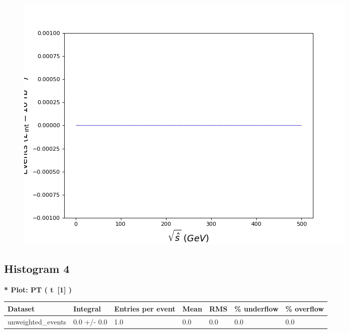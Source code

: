 \documentclass[a4paper, 10pt]{article}
\begin{document}
\begin{figure}[H]
  \begin{center}
    \includegraphics[scale=0.45]{selection_2.png}\\
\caption{   }
  \end{center}
\end{figure}
      \newpage
\subsection{ Histogram 4}

\textbf{* Plot: PT ( t~[1] ) }\\
   \begin{table}[H]
  \begin{center}
    \begin{tabular}{|m{23.0mm}|m{23.0mm}|m{18.0mm}|m{19.0mm}|m{19.0mm}|m{19.0mm}|m{19.0mm}|}
      \hline
      {\cellcolor{yellow}         Dataset}& {\cellcolor{yellow}         Integral}& {\cellcolor{yellow}         Entries per event}& {\cellcolor{yellow}         Mean}& {\cellcolor{yellow}         RMS}& {\cellcolor{yellow}         \% underflow}& {\cellcolor{yellow}         \% overflow}\\
      \hline
      {\cellcolor{white}         unweighted\_events}& {\cellcolor{white}         0.0 +/\-- 0.0}& {\cellcolor{white}         1.0}& {\cellcolor{white}         0.0}& {\cellcolor{white}         0.0}& {\cellcolor{green}         0.0}& {\cellcolor{green}         0.0}\\
\hline
    \end{tabular}
  \end{center}
\end{table}
\end{document}

